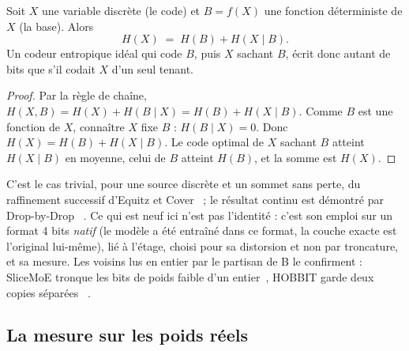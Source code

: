 \begin{proposition}\label{prop:raffinement}
Soit $X$ une variable discrète (le code) et $B = f(X)$ une fonction déterministe de $X$ (la base). Alors
\begin{equation}\label{eq:raffinement}
H(X) \;=\; H(B) + H(X \mid B).
\end{equation}
Un codeur entropique idéal qui code $B$, puis $X$ sachant $B$, écrit donc autant de bits que s'il codait $X$ d'un seul tenant.
\end{proposition}

\begin{proof}
Par la règle de chaîne, $H(X, B) = H(X) + H(B \mid X) = H(B) + H(X \mid B)$. Comme $B$ est une fonction de $X$, connaître $X$ fixe $B$ : $H(B \mid X) = 0$. Donc $H(X) = H(B) + H(X \mid B)$. Le code optimal de $X$ sachant $B$ atteint $H(X \mid B)$ en moyenne, celui de $B$ atteint $H(B)$, et la somme est $H(X)$.
\end{proof}

C'est le cas trivial, pour une source discrète et un sommet sans perte, du raffinement successif d'Equitz et Cover~\cite{equitz1991successive} ; le résultat continu est démontré par Drop-by-Drop~\cite{babaoglu2026dropbydrop} \litt. Ce qui est neuf ici n'est pas l'identité : c'est son emploi sur un format 4 bits \emph{natif} (le modèle a été entraîné dans ce format, la couche exacte est l'original lui-même), lié à l'étage, choisi pour sa distorsion et non par troncature, et sa mesure. Les voisins lus en entier par le partisan de B le confirment : SliceMoE tronque les bits de poids faible d'un entier~\cite{choi2025slicemoecorps}, HOBBIT garde deux copies séparées~\cite{tang2024hobbit} \litt.

\subsection{La mesure sur les poids réels}

